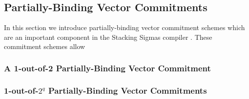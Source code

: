 \subsection{Partially-Binding Vector Commitments}
In this section we introduce partially-binding vector commitment schemes which are an important component in the Stacking Sigmas compiler \cite{StackingSigmas}. These commitment schemes allow 

\subsubsection{A 1-out-of-2 Partially-Binding Vector Commitment}


\subsubsection{1-out-of-$2^q$ Partially-Binding Vector Commitments}








